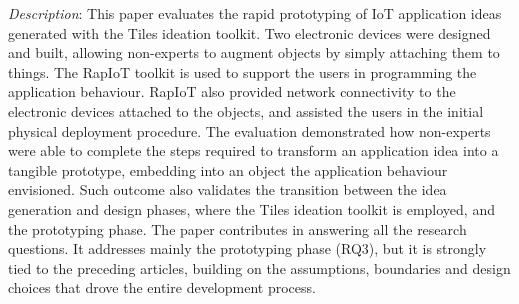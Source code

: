 \emph{Description}: This paper evaluates the rapid prototyping of IoT application ideas generated with the Tiles ideation toolkit. Two electronic devices were designed and built, allowing non-experts to augment objects by simply attaching them to things. The RapIoT toolkit is used to support the users in programming the application behaviour. RapIoT also provided network connectivity to the electronic devices attached to the objects, and assisted the users in the initial physical deployment procedure. The evaluation demonstrated how non-experts were able to complete the steps required to transform an application idea into a tangible prototype, embedding into an object the application behaviour envisioned. Such outcome also validates the transition between the idea generation and design phases, where the Tiles ideation toolkit is employed, and the prototyping phase.
The paper contributes in answering all the research questions. It addresses mainly the prototyping phase (RQ3), but it is strongly tied to the preceding articles, building on the assumptions, boundaries and design choices that drove the entire development process.
